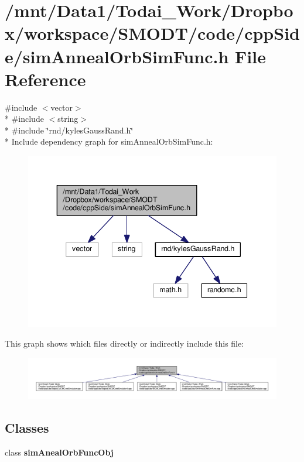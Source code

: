 \section{/mnt/\-Data1/\-Todai\-\_\-\-Work/\-Dropbox/workspace/\-S\-M\-O\-D\-T/code/cpp\-Side/sim\-Anneal\-Orb\-Sim\-Func.h File Reference}
\label{sim_anneal_orb_sim_func_8h}
{\ttfamily \#include $<$vector$>$}\\*
{\ttfamily \#include $<$string$>$}\\*
{\ttfamily \#include \char`\"{}rnd/kyles\-Gauss\-Rand.\-h\char`\"{}}\\*
Include dependency graph for sim\-Anneal\-Orb\-Sim\-Func.\-h\-:\nopagebreak
\begin{figure}[H]
\begin{center}
\leavevmode
\includegraphics[width=339pt]{sim_anneal_orb_sim_func_8h__incl}
\end{center}
\end{figure}
This graph shows which files directly or indirectly include this file\-:\nopagebreak
\begin{figure}[H]
\begin{center}
\leavevmode
\includegraphics[width=350pt]{sim_anneal_orb_sim_func_8h__dep__incl}
\end{center}
\end{figure}
\subsection*{Classes}
\begin{DoxyCompactItemize}
\item 
class {\bf sim\-Aneal\-Orb\-Func\-Obj}
\end{DoxyCompactItemize}
